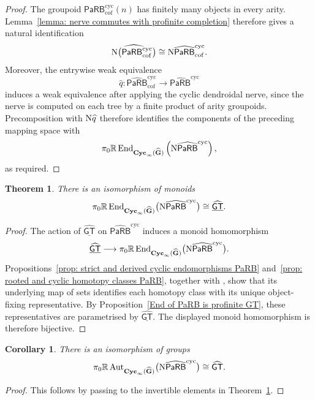\documentclass{amsart}
\newcommand{\Grpd}{\mathbf{G}}
\newcommand{\PaRB}{\mathsf{PaRB}}
\newcommand{\Cyc}{\mathbf{Cyc}}
\newcommand{\End}{\operatorname{End}}
\newcommand{\Aut}{\operatorname{Aut}}
\newcommand{\nerve}{\textnormal{N}}
\newcommand{\GT}{\widehat{\mathsf{GT}}}
\newtheorem{thm}[theorem]{Theorem}%
\newtheorem{cor}[theorem]{Corollary}%
\theoremstyle{definition}
\numberwithin{equation}{section}
\begin{document}
\begin{proof}
The groupoid
$\PaRB_{\mathrm{cof}}^{\mathrm{cyc}}(n)$ has finitely many objects
in every arity. Lemma~\ref{lemma: nerve commutes with profinite completion}
therefore gives a natural identification
\[
\widehat{\nerve\bigl(
\PaRB_{\mathrm{cof}}^{\mathrm{cyc}}
\bigr)}
\cong
\nerve\widehat{\PaRB}_{\mathrm{cof}}^{\mathrm{cyc}}.
\]
Moreover, the entrywise weak equivalence
\[
\widehat q\colon
\widehat{\PaRB}_{\mathrm{cof}}^{\mathrm{cyc}}
\longrightarrow
\widehat{\PaRB}^{\mathrm{cyc}}
\]
induces a weak equivalence after applying the cyclic dendroidal
nerve, since the nerve is computed on each tree by a finite product
of arity groupoids. Precomposition with $\nerve\widehat q$ therefore
identifies the components of the preceding mapping space with
\[
\pi_0\mathbb R\End_{\Cyc_\infty(\widehat{\Grpd})}
\left(
\nerve\widehat{\PaRB}^{\mathrm{cyc}}
\right),
\]
as required.
\end{proof}


\begin{thm}
\label{thm: GT as homotopy cyclic endomorphisms}
There is an isomorphism of monoids
\[
\pi_0\mathbb R\End_{\Cyc_\infty(\widehat{\Grpd})}
\bigl(\nerve\widehat{\PaRB}^{\mathrm{cyc}}\bigr)
\cong
\underline{\GT}.
\]
\end{thm}

\begin{proof}
The action of $\underline{\GT}$ on
$\widehat{\PaRB}^{\mathrm{cyc}}$ induces a monoid homomorphism
\[
\underline{\GT}
\longrightarrow
\pi_0\mathbb R\End_{\Cyc_\infty(\widehat{\Grpd})}
\bigl(\nerve\widehat{\PaRB}^{\mathrm{cyc}}\bigr).
\]
Propositions~\ref{prop: strict and derived cyclic endomorphisms PaRB}
and~\ref{prop: rooted and cyclic homotopy classes PaRB}, together
with \cite[Proposition~8.1]{Boavida-Horel-Robertson}, show that its
underlying map of sets identifies each homotopy class with its unique
object-fixing representative. By
Proposition~\ref{End of PaRB is profinite GT}, these
representatives are parametrised by $\underline{\GT}$. The displayed
monoid homomorphism is therefore bijective.
\end{proof}

\begin{cor}
\label{cor: GT as cyclic operad}
There is an isomorphism of groups
\[
\pi_0\mathbb R\Aut_{\Cyc_\infty(\widehat{\Grpd})}
\bigl(\nerve\widehat{\PaRB}^{\mathrm{cyc}}\bigr)
\cong
\GT.
\]
\end{cor}

\begin{proof}
This follows by passing to the invertible elements in
Theorem~\ref{thm: GT as homotopy cyclic endomorphisms}.
\end{proof}
\end{document}
